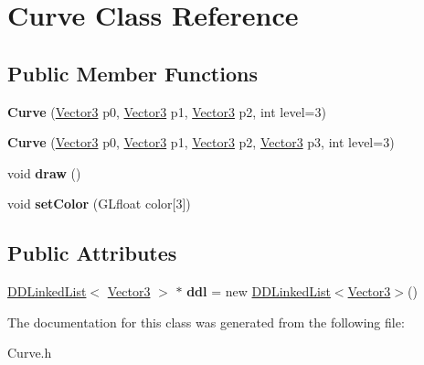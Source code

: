 \hypertarget{class_curve}{}\section{Curve Class Reference}
\label{class_curve}
\subsection*{Public Member Functions}
\begin{DoxyCompactItemize}
\item 
\mbox{\label{class_curve_a02f2af392d6b58dea2670cbda7507258}} 
{\bfseries Curve} (\mbox{\hyperlink{class_vector3}{Vector3}} p0, \mbox{\hyperlink{class_vector3}{Vector3}} p1, \mbox{\hyperlink{class_vector3}{Vector3}} p2, int level=3)
\item 
\mbox{\label{class_curve_abf50fa354857985ce18f9753e452331e}} 
{\bfseries Curve} (\mbox{\hyperlink{class_vector3}{Vector3}} p0, \mbox{\hyperlink{class_vector3}{Vector3}} p1, \mbox{\hyperlink{class_vector3}{Vector3}} p2, \mbox{\hyperlink{class_vector3}{Vector3}} p3, int level=3)
\item 
\mbox{\label{class_curve_a32c7bd32d4acebaef0517c2c1d64f49d}} 
void {\bfseries draw} ()
\item 
\mbox{\label{class_curve_a27c5022ae8df5e634999aab65f708621}} 
void {\bfseries set\+Color} (G\+Lfloat color\mbox{[}3\mbox{]})
\end{DoxyCompactItemize}
\subsection*{Public Attributes}
\begin{DoxyCompactItemize}
\item 
\mbox{\label{class_curve_ae2321eec1b936ebd263d50008170b58f}} 
\mbox{\hyperlink{class_d_d_linked_list}{D\+D\+Linked\+List}}$<$ \mbox{\hyperlink{class_vector3}{Vector3}} $>$ $\ast$ {\bfseries ddl} = new \mbox{\hyperlink{class_d_d_linked_list}{D\+D\+Linked\+List}}$<$\mbox{\hyperlink{class_vector3}{Vector3}}$>$()
\end{DoxyCompactItemize}


The documentation for this class was generated from the following file\+:\begin{DoxyCompactItemize}
\item 
Curve.\+h\end{DoxyCompactItemize}
